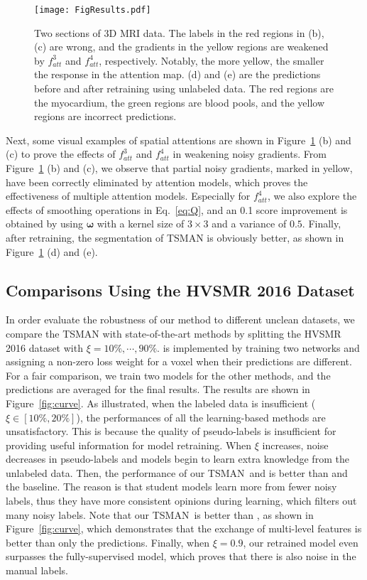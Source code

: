 \documentclass[letterpaper]{article} %
\begin{document}
\begin{figure}[t]
	\begin{center}
		\texttt{[image: FigResults.pdf]}
	\end{center}
	\caption{Two sections of 3D MRI data. The labels in the red regions in (b), (c) are wrong, and the gradients in the yellow regions are weakened by $f_{att}^3$ and $f_{att}^4$, respectively. Notably, the more yellow, the smaller the response in the attention map. (d) and (e) are the predictions before and after retraining using unlabeled data. The red regions are the myocardium, the green regions are blood pools, and the yellow regions are incorrect predictions.}
	\label{fig:results}
\end{figure}
Next, some visual examples of spatial attentions are shown in Figure~\ref{fig:results} (b) and (c) to prove the effects of $f_{att}^{3}$ and $f_{att}^{4}$ in weakening noisy gradients.
From Figure~\ref{fig:results} (b) and (c), we observe that partial noisy gradients, marked in yellow, have been correctly eliminated by attention models, which proves the effectiveness of multiple attention models.
Especially for $f_{att}^{4}$, we also explore the effects of smoothing operations in Eq.~\ref{eq:Q}, and an 0.1 score improvement is obtained by using $\bm{\omega}$ with a kernel size of $3\times 3$ and a variance of $0.5$.
Finally, after retraining, the segmentation of TSMAN is obviously better, as shown in Figure~\ref{fig:results} (d) and (e).

\subsection{Comparisons Using the HVSMR 2016 Dataset}
In order evaluate the robustness of our method to different unclean datasets, we compare the TSMAN with state-of-the-art methods \cite{NIPS2017_6697,Jagersand2017,Yu2017} by splitting the HVSMR 2016 dataset with $\xi=10\%, \cdots,90\%$.
\cite{NIPS2017_6697} is implemented by training two networks and assigning a non-zero loss weight for a voxel when their predictions are different.
For a fair comparison, we train two models for the other methods, and the predictions are averaged for the final results.
The results are shown in Figure~\ref{fig:curve}.
As illustrated, when the labeled data is insufficient ($\xi\in[10\%,20\%]$), the performances of all the learning-based methods are unsatisfactory.
This is because the quality of pseudo-labels is insufficient for providing useful information for model retraining.
When $\xi$ increases, noise decreases in pseudo-labels and models begin to learn extra knowledge from the unlabeled data.
Then, the performance of our TSMAN~and \cite{NIPS2017_6697} is better than \cite{Jagersand2017} and the baseline.
The reason is that student models learn more from fewer noisy labels, thus they have more consistent opinions during learning, which filters out many noisy labels.
Note that our TSMAN~is better than \cite{NIPS2017_6697}, as shown in Figure~\ref{fig:curve}, which demonstrates that the exchange of multi-level features is better than only the predictions.
Finally, when $\xi=0.9$, our retrained model even surpasses the fully-supervised model, which proves that there is also noise in the manual labels.
\end{document}
